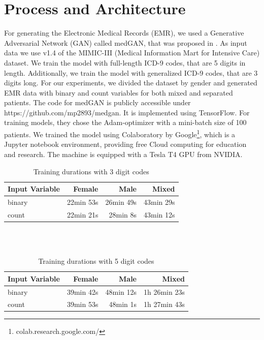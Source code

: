 \documentclass[11pt, a4paper]{book}
\begin{document}
\section{Process and Architecture}
For generating the Electronic Medical Records (EMR), we used a Generative Adversarial Network (GAN) called medGAN, that was proposed in \cite{Choi2017}. As input data we use v1.4 of the MIMIC-III (Medical Information Mart for Intensive Care) dataset. We train the model with full-length ICD-9 codes, that are 5 digits in length. Additionally, we train the model with generalized ICD-9 codes, that are 3 digits long. For our experiments, we divided the dataset by gender and generated EMR data with binary and count variables for both mixed and separated patients. The code for medGAN is publicly accessible under https://github.com/mp2893/medgan. It is implemented using TensorFlow.
For training models, they chose the Adam-optimizer with a mini-batch size of 100 patients. \cite{Choi2017} We trained the model using Colaboratory by Google\footnote{colab.research.google.com/}, which is a Jupyter notebook environment, providing free Cloud computing for education and research.
The machine is equipped with a Tesla T4 GPU from NVIDIA.

\begin{table}
\begin{center}
\begin{tabularx}{\textwidth}{X|r|r|r}
Input Variable & Female & Male & Mixed \\
\hline
binary & 22min 53s & 26min 49s & 43min 29s\\
count & 22min 21s & 28min 8s & 43min 12s\\
\end{tabularx}
\caption{Training durations with 3 digit codes}
\end{center}
\end{table}
\\
\\
\begin{table}
\begin{center}
\begin{tabularx}{\textwidth}{X|r|r|r}
Input Variable & Female & Male & Mixed \\
\hline
binary & 39min 42s & 48min 12s & 1h 26min 23s\\
count & 39min 53s & 48min 1s & 1h 27min 43s\\
\end{tabularx}
\caption{Training durations with 5 digit codes}
\end{center}
\end{table}
\end{document}
